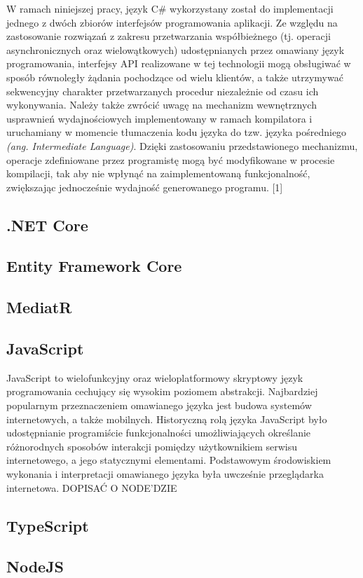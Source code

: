 W ramach niniejszej pracy, język C\# wykorzystany został do implementacji jednego z dwóch zbiorów interfejsów programowania aplikacji. Ze względu na zastosowanie rozwiązań z zakresu przetwarzania współbieżnego (tj. operacji asynchronicznych oraz wielowątkowych) udostępnianych przez omawiany język programowania, interfejsy API realizowane w tej technologii mogą obsługiwać w sposób równoległy żądania pochodzące od wielu klientów, a także utrzymywać sekwencyjny charakter przetwarzanych procedur niezależnie od czasu ich wykonywania. Należy także zwrócić uwagę na mechanizm wewnętrznych usprawnień wydajnościowych implementowany w ramach kompilatora i uruchamiany w momencie tłumaczenia kodu języka do tzw. języka pośredniego \textit{(ang. Intermediate Language)}. Dzięki zastosowaniu przedstawionego mechanizmu, operacje zdefiniowane przez programistę mogą być modyfikowane w procesie kompilacji, tak aby nie wpłynąć na zaimplementowaną funkcjonalność, zwiększając jednocześnie wydajność generowanego programu. [1]
\subsection*{.NET Core}
\subsection*{Entity Framework Core}
\subsection*{MediatR}
\subsection*{JavaScript}
JavaScript to wielofunkcyjny oraz wieloplatformowy skryptowy język programowania cechujący się wysokim poziomem abstrakcji. Najbardziej popularnym przeznaczeniem omawianego języka jest budowa systemów internetowych, a także mobilnych. Historyczną rolą języka JavaScript było udostępnianie programiście funkcjonalności umożliwiających określanie różnorodnych sposobów interakcji pomiędzy użytkownikiem serwisu internetowego, a jego statycznymi elementami. Podstawowym środowiskiem wykonania i interpretacji omawianego języka była uwcześnie przeglądarka internetowa. DOPISAĆ O NODE'DZIE
\subsection*{TypeScript}
\subsection*{NodeJS}
